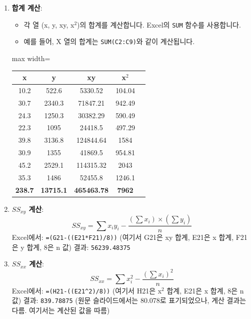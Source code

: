 \documentclass[11pt,a4paper]{book}
\theoremstyle{definition}
\begin{document}
\begin{tcolorbox}[examplebox, title={Excel 실습: 인구 및 매출 데이터}]
\begin{enumerate}[label=\arabic*.]
    \item \textbf{합계 계산}:
    \begin{itemize}
        \item 각 열 (x, y, xy, x$^2$)의 합계를 계산합니다. Excel의 \texttt{SUM} 함수를 사용합니다.
        \item 예를 들어, X 열의 합계는 \texttt{SUM(C2:C9)}와 같이 계산됩니다.
    \end{itemize}
    \begin{adjustbox}{max width=\textwidth}
    \begin{tabular}{ccccc}
    \toprule
    \textbf{x} & \textbf{y} & \textbf{xy} & \textbf{x$^2$} \\
    \midrule
    10.2 & 522.6 & 5330.52 & 104.04 \\
    30.7 & 2340.3 & 71847.21 & 942.49 \\
    24.3 & 1250.3 & 30382.29 & 590.49 \\
    22.3 & 1095 & 24418.5 & 497.29 \\
    39.8 & 3136.8 & 124844.64 & 1584 \\
    30.9 & 1355 & 41869.5 & 954.81 \\
    45.2 & 2529.1 & 114315.32 & 2043 \\
    35.3 & 1486 & 52455.8 & 1246.1 \\
    \midrule
    \textbf{238.7} & \textbf{13715.1} & \textbf{465463.78} & \textbf{7962} \\
    \bottomrule
    \end{tabular}
    \end{adjustbox}

    \item \textbf{$SS_{xy}$ 계산}:
    \begin{equation*}
    SS_{xy} = \sum x_iy_i - \frac{(\sum x_i) \times (\sum y_i)}{n}
    \end{equation*}
    Excel에서: \texttt{=(G21-((E21*F21)/8))} (여기서 G21은 xy 합계, E21은 x 합계, F21은 y 합계, 8은 n 값)
    결과: \texttt{56239.48375}

    \item \textbf{$SS_{xx}$ 계산}:
    \begin{equation*}
    SS_{xx} = \sum x_i^2 - \frac{(\sum x_i)^2}{n}
    \end{equation*}
    Excel에서: \texttt{=(H21-((E21^2)/8))} (여기서 H21은 x$^2$ 합계, E21은 x 합계, 8은 n 값)
    결과: \texttt{839.78875} (원문 슬라이드에서는 80.078로 표기되었으나, 계산 결과는 다름. 여기서는 계산된 값을 따름)


\end{enumerate}
\end{tcolorbox}
\end{document}

